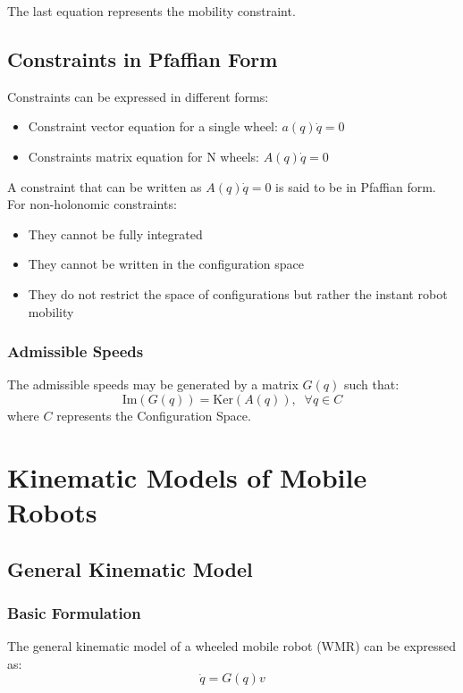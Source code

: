 \documentclass[openany]{book}
\theoremstyle{definition}
\theoremstyle{remark}
\begin{document}
The last equation represents the mobility constraint.

\section{Constraints in Pfaffian Form}

Constraints can be expressed in different forms:
\begin{itemize}
    \item Constraint vector equation for a single wheel: $a(q)\dot{q} = 0$
    \item Constraints matrix equation for N wheels: $A(q)\dot{q} = 0$
\end{itemize}

A constraint that can be written as $A(q)\dot{q} = 0$ is said to be in Pfaffian form. For non-holonomic constraints:
\begin{itemize}
    \item They cannot be fully integrated
    \item They cannot be written in the configuration space
    \item They do not restrict the space of configurations but rather the instant robot mobility
\end{itemize}

\subsection{Admissible Speeds}
The admissible speeds may be generated by a matrix $G(q)$ such that:
\begin{equation}
    \text{Im}(G(q)) = \text{Ker}(A(q)), \;\; \forall q \in C
\end{equation}
where $C$ represents the Configuration Space.

\chapter{Kinematic Models of Mobile Robots}

\section{General Kinematic Model}

\subsection{Basic Formulation}
The general kinematic model of a wheeled mobile robot (WMR) can be expressed as:
\begin{equation}
    \dot{q} = G(q)v
\end{equation}
\end{document}
